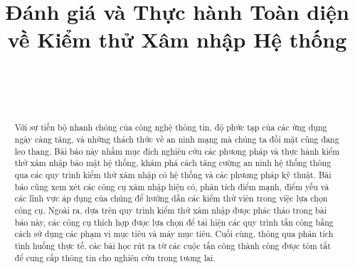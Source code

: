 \documentclass[conference]{IEEEtran}
\begin{document}
\title{Đánh giá và Thực hành Toàn diện về Kiểm thử Xâm nhập Hệ thống\\
}
 
\author{
 \\
\and
{}
 \\
\and
{}
}

\maketitle

\begin{abstract}
Với sự tiến bộ nhanh chóng của công nghệ thông tin, độ phức tạp của các ứng dụng ngày càng tăng, và những thách thức về an ninh mạng mà chúng ta đối mặt cũng đang leo thang. Bài báo này nhằm mục đích nghiên cứu các phương pháp và thực hành kiểm thử xâm nhập bảo mật hệ thống, khám phá cách tăng cường an ninh hệ thống thông qua các quy trình kiểm thử xâm nhập có hệ thống và các phương pháp kỹ thuật. Bài báo cũng xem xét các công cụ xâm nhập hiện có, phân tích điểm mạnh, điểm yếu và các lĩnh vực áp dụng của chúng để hướng dẫn các kiểm thử viên trong việc lựa chọn công cụ. Ngoài ra, dựa trên quy trình kiểm thử xâm nhập được phác thảo trong bài báo này, các công cụ thích hợp được lựa chọn để tái hiện các quy trình tấn công bằng cách sử dụng các phạm vi mục tiêu và máy mục tiêu. Cuối cùng, thông qua phân tích tình huống thực tế, các bài học rút ra từ các cuộc tấn công thành công được tóm tắt để cung cấp thông tin cho nghiên cứu trong tương lai.
\end{abstract}
\end{document}
